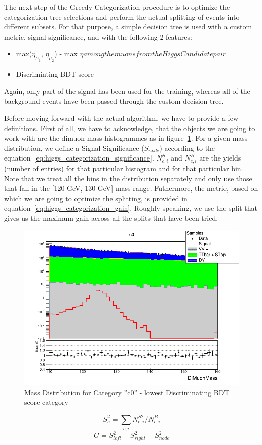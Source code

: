 The next step of the Greedy Categorization procedure is to optimize the categorization tree selections and perform the actual splitting of events into different subsets. For that purpose, a simple decision tree is used with a custom metric, signal significance, and with the following 2 features:
\begin{itemize}
  \item max($\eta_{\mu_1}$, $\eta_{\mu_2}$) - max $\eta among the muons from the Higgs Candidate pair$
  \item Discriminting BDT score
\end{itemize}
Again, only part of the signal has been used for the training, whereas all of the background events have been passed through the custom decision tree.

Before moving forward with the actual algorithm, we have to provide a few definitions. First of all, we have to acknowledge, that the objects we are going to work with are the dimuon mass histogrammes as in figure~\ref{fig:higgs_categorization_massc0}. For a given mass distribution, we define a Signal Significance ($S_{node}$) according to the equation~\ref{eq:higgs_categorization_significance}. $N^{S}_{c,i}$ and $N^{B}_{c,i}$ are the yields (number of entries) for that particular histogram and for that particular bin. Note that we treat all the bins in the distribution separately and only use those that fall in the [120 GeV, 130 GeV] mass range. Futhermore, the metric, based on which we are going to optimize the splitting, is provided in equation~\ref{eq:higgs_categorization_gain}. Roughly speaking, we use the split that gives us the maximum gain across all the splits that have been tried.
\begin{figure}[hbp]
  \centering
  \includegraphics[width=0.9\linewidth]{figures/ch_higgs/distributions/bdt_uf/distribution__c0__DiMuonMass__logY.png}
  \caption{Mass Distribution for Category ''c0'' - lowest Discriminating BDT score category}
  \label{fig:higgs_categorization_massc0}
\end{figure}
\begin{equation}
  {S^2_c} = \sum_{c,i}N^{S2}_{c,i}/N^{B}_{c,i}
  \label{eq:higgs_categorization_significance}
\end{equation}
\begin{equation}
  {G} = {S^2_{left}} + {S^2_{right}} - {S^2_{node}}
  \label{eq:higgs_categorization_gain}
\end{equation}


